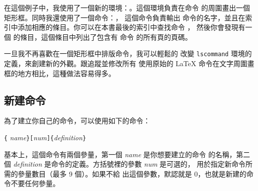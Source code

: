\begin{example}
\begin{lscommand}
\end{lscommand}
\end{example}

在這個例子中，我使用了一個新的環境：。這個環境負責在命令
的周圍畫出一個矩形框。同時我還使用了一個命令：， 這個命令負責輸出
命令的名字，並且在索引中添加相應的條目。你可以在本書最後的索引中查找命令 ，
然後你會發現有一個  的條目，這個條目中列出了包含有  命令
的所有頁的頁碼。

一旦我不再喜歡在一個矩形框中排版命令，我可以輕鬆的
改變 \texttt{lscommand} 環境的定義，來創建新的外觀。跟追蹤並修改所有
使用原始的 \LaTeX{} 命令在文字周圍畫框的地方相比，這種做法容易得多。

\subsection{新建命令}

為了建立你自己的命令，可以使用如下的命令：
\begin{lscommand}
\verb|{|%
       \emph{name}\verb|}[|\emph{num}\verb|]{|\emph{definition}\verb|}|
\end{lscommand}
基本上，這個命令有兩個參量，第一個 \emph{name} 是你想要建立的命令
的名稱，第二個 \emph{definition} 是命令的定義。方括號裡的參數 \emph{num} 是可選的，
用於指定新命令所需的參量數目（最多 9 個）。如果不給
出這個參數，默認就是 0，也就是新建的命令不要任何參量。

